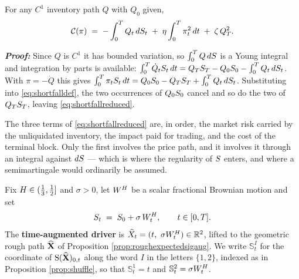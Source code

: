 
\begin{lemma}\label{lem:shortfall}
For any $C^{1}$ inventory path $Q$ with $Q_0$ given,
\begin{equation}\label{eq:shortfallreduced}
  \mathcal{C}(\pi)\;=\;-\int_0^{T}Q_t\,dS_t
  \;+\;\eta\int_0^{T}\pi_t^{2}\,d t
  \;+\;\zeta\,Q_T^{2}.
\end{equation}
\end{lemma}

\textbf{\textit{Proof:}} Since $Q$ is $C^{1}$ it has bounded variation, so $\int_0^T Q\,dS$
is a Young integral and integration by parts
is available:
$\int_0^{T}\dot Q_tS_t\,d t = Q_TS_T-Q_0S_0-\int_0^{T}Q_t\,dS_t$.
With $\pi=-\dot Q$ this gives
$\int_0^{T}\pi_tS_t\,d t = Q_0S_0-Q_TS_T+\int_0^{T}Q_t\,dS_t$.
Substituting into \eqref{eq:shortfalldef}, the two occurrences of $Q_0S_0$ cancel and so do the
two of $Q_TS_T$, leaving \eqref{eq:shortfallreduced}. \qedfilledtext

\medskip

The three terms of \eqref{eq:shortfallreduced} are, in order, the market risk carried by the
unliquidated inventory, the impact paid for trading, and the cost of the terminal block. Only the
first involves the price path, and it involves it through an integral against $dS$ --- which is
where the regularity of $S$ enters, and where a semimartingale would ordinarily be assumed.

\begin{definition}\label{def:roughexecution}
Fix $H\in(\tfrac13,\tfrac12]$ and $\sigma>0$, let $W^{H}$ be a scalar fractional Brownian motion
and set
\begin{equation}\label{eq:arithmeticrough}
  S_t \;=\; S_0+\sigma\,W^{H}_t ,\qquad t\in[0,T].
\end{equation}
The \textbf{time-augmented driver} is $\widehat X_t=(t,\ \sigma W^{H}_t)\in\mathbb{R}^{2}$, lifted to the
geometric rough path $\widehat{\mathbf{X}}$ of Proposition \ref{prop:roughexpectedsigaug}. We write
$\mathbb{S}^{I}_t$ for the coordinate of $\mathrm{S}(\widehat{\mathbf{X}})_{0,t}$ along the word $I$ in the letters
$\{1,2\}$, indexed as in Proposition \ref{prop:shuffle}, so that $\mathbb{S}^{1}_t=t$ and
$\mathbb{S}^{2}_t=\sigma W^{H}_t$.
\end{definition}

